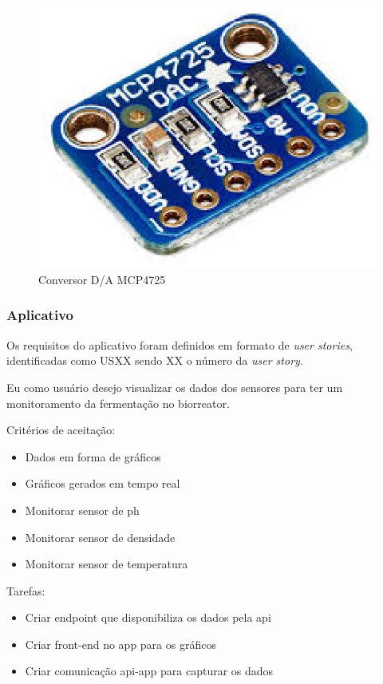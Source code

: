 \begin{figure}[h]
	\centering
	\includegraphics[keepaspectratio=true,scale=0.3]{figuras/sensor4.eps}
	\caption{Conversor D/A MCP4725}
	\label{sensor4}
\end{figure}

\subsubsection{Aplicativo}

Os requisitos do aplicativo foram definidos em formato de \textit{user stories}, identificadas como USXX sendo XX o número da \textit{user story}.


Eu como usuário desejo visualizar os dados dos sensores para ter um monitoramento da fermentação no biorreator.

Critérios de aceitação:
\begin{itemize}
  \item Dados em forma de gráficos
  \item Gráficos gerados em tempo real
  \item Monitorar sensor de ph
  \item Monitorar sensor de densidade
  \item Monitorar sensor de temperatura
\end{itemize}

Tarefas:
\begin{itemize}
  \item Criar endpoint que disponibiliza os dados pela api
  \item Criar front-end no app para os gráficos
  \item Criar comunicação api-app para capturar os dados
\end{itemize}

